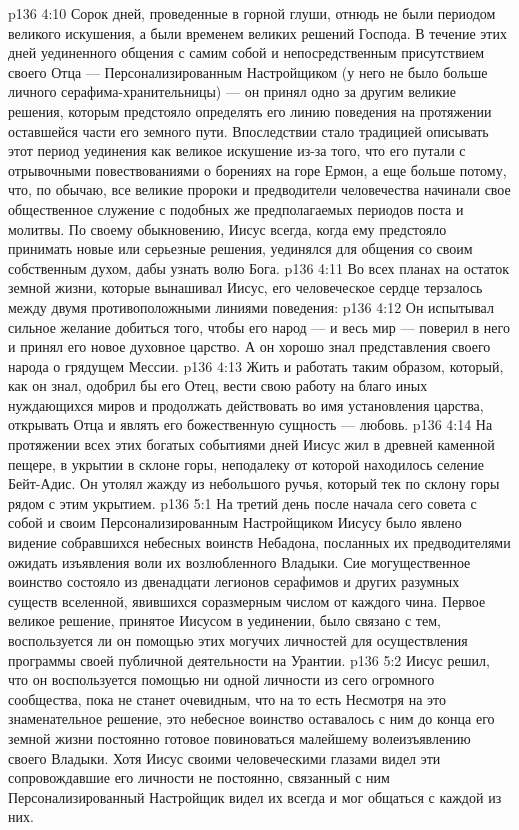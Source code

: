 \vs p136 4:10 \pc Сорок дней, проведенные в горной глуши, отнюдь не были периодом великого искушения, а были временем великих решений Господа. В течение этих дней уединенного общения с самим собой и непосредственным присутствием своего Отца --- Персонализированным Настройщиком (у него не было больше личного серафима\hyp{}хранительницы) --- он принял одно за другим великие решения, которым предстояло определять его линию поведения на протяжении оставшейся части его земного пути. Впоследствии стало традицией описывать этот период уединения как великое искушение из\hyp{}за того, что его путали с отрывочными повествованиями о борениях на горе Ермон, а еще больше потому, что, по обычаю, все великие пророки и предводители человечества начинали свое общественное служение с подобных же предполагаемых периодов поста и молитвы. По своему обыкновению, Иисус всегда, когда ему предстояло принимать новые или серьезные решения, уединялся для общения со своим собственным духом, дабы узнать волю Бога.
\vs p136 4:11 \pc Во всех планах на остаток земной жизни, которые вынашивал Иисус, его человеческое сердце терзалось между двумя противоположными линиями поведения:
\vs p136 4:12 \bibnobreakspace Он испытывал сильное желание добиться того, чтобы его народ --- и весь мир --- поверил в него и принял его новое духовное царство. А он хорошо знал представления своего народа о грядущем Мессии.
\vs p136 4:13 \bibnobreakspace Жить и работать таким образом, который, как он знал, одобрил бы его Отец, вести свою работу на благо иных нуждающихся миров и продолжать действовать во имя установления царства, открывать Отца и являть его божественную сущность --- любовь.
\vs p136 4:14 \pc На протяжении всех этих богатых событиями дней Иисус жил в древней каменной пещере, в укрытии в склоне горы, неподалеку от которой находилось селение Бейт\hyp{}Адис. Он утолял жажду из небольшого ручья, который тек по склону горы рядом с этим укрытием.
\vs p136 5:1 На третий день после начала сего совета с собой и своим Персонализированным Настройщиком Иисусу было явлено видение собравшихся небесных воинств Небадона, посланных их предводителями ожидать изъявления воли их возлюбленного Владыки. Сие могущественное воинство состояло из двенадцати легионов серафимов и других разумных существ вселенной, явившихся соразмерным числом от каждого чина. Первое великое решение, принятое Иисусом в уединении, было связано с тем, воспользуется ли он помощью этих могучих личностей для осуществления программы своей публичной деятельности на Урантии.
\vs p136 5:2 Иисус решил, что он  воспользуется помощью ни одной личности из сего огромного сообщества, пока не станет очевидным, что на то есть  Несмотря на это знаменательное решение, это небесное воинство оставалось с ним до конца его земной жизни постоянно готовое повиноваться малейшему волеизъявлению своего Владыки. Хотя Иисус своими человеческими глазами видел эти сопровождавшие его личности не постоянно, связанный с ним Персонализированный Настройщик видел их всегда и мог общаться с каждой из них.
